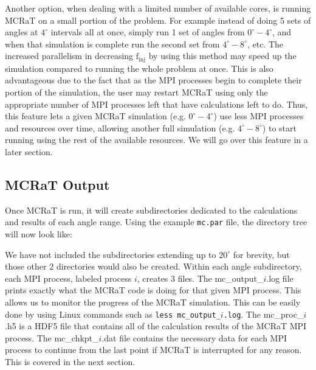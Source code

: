 \documentclass[12pt,a4paper]{article}
\begin{document}
 Another option, when dealing with a limited number of available cores, is running MCRaT on a small portion of the problem. For example instead of doing 5 sets of angles at $4^\circ$ intervals all at once, simply run 1 set of angles from $0^\circ-4^\circ$, and when that simulation is complete run the second set from $4^\circ-8^\circ$, etc. The increased parallelism in decreasing $\mathrm{f_{inj}}$ by using this method may speed up the simulation compared to running the whole problem at once. This is also advantageous due to the fact that as the MPI processes begin to complete their portion of the simulation, the user may restart MCRaT using only the appropriate number of MPI processes left that have calculations left to do. Thus, this feature lets a given MCRaT simulation (e.g. $0^\circ-4^\circ$) use less MPI processes and resources over time, allowing another full simulation (e.g. $4^\circ-8^\circ$) to start running using the rest of the available resources. We will go over this feature in a later section.
 
 \subsection{MCRaT Output}
 Once MCRaT is run, it will create subdirectories dedicated to the calculations and results of each angle range. Using the example \texttt{mc.par} file, the directory tree will now look like: 
 
 \begin{figure}[h!]
 \end{figure}
 
 We have not included the subdirectories extending up to $20^\circ$ for brevity, but those other 2 directories would also be created. Within each angle subdirectory, each MPI process, labeled process $i$, creates 3 files. The mc\_output\_$i$.log file prints exactly what the MCRaT code is doing for that given MPI process. This allows us to monitor the progress of the MCRaT simulation. This can be easily done by using Linux commands such as \texttt{less mc\_output\_$i$.log}. The mc\_proc\_$i$.h5 is a HDF5 file that contains all of the calculation results of the MCRaT MPI process. The mc\_chkpt\_$i$.dat file contains the necessary data for each MPI process to continue from the last point if MCRaT is interrupted for any reason. This is covered in the next section.
 
\end{document}
